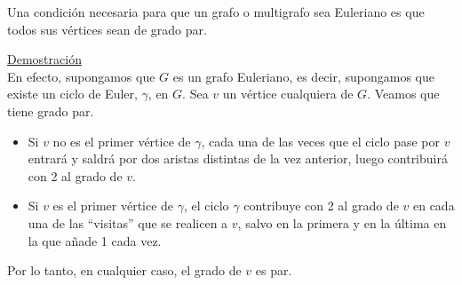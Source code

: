 \begin{fondo}
Una condición necesaria para que un grafo o multigrafo sea Euleriano es que todos sus vértices sean de grado par.
\end{fondo}

\underline{Demostración}\\

En efecto, supongamos que $G$ es un grafo Euleriano, es decir, supongamos que existe un ciclo de Euler, $\gamma$, en $G$. Sea $v$ un vértice cualquiera de $G$. Veamos que tiene grado par.

\begin{itemize}
\item Si $v$ no es el primer vértice de $\gamma$, cada una de las veces que el ciclo pase por $v$ entrará y saldrá por dos aristas distintas de la vez anterior, luego contribuirá con 2 al grado de $v$.
\item Si $v$ es el primer vértice de $\gamma$, el ciclo $\gamma$ contribuye con 2 al grado de $v$ en cada una de las ``visitas'' que se realicen a $v$, salvo en la primera y en la última en la que añade 1 cada vez.
\end{itemize}

Por lo tanto, en cualquier caso, el grado de $v$ es par.\\


